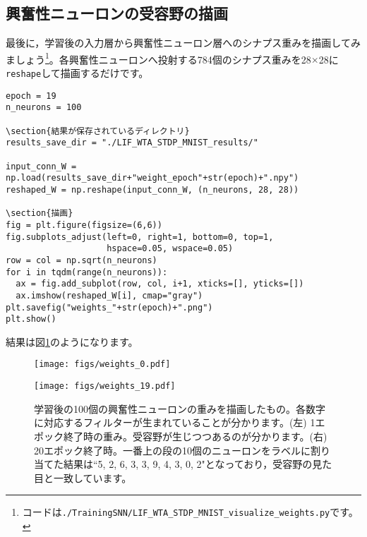 \subsection{興奮性ニューロンの受容野の描画}
最後に，学習後の入力層から興奮性ニューロン層へのシナプス重みを描画してみましょう\footnote{コードは\texttt{./TrainingSNN/LIF\_WTA\_STDP\_MNIST\_visualize\_weights.py}です。}。各興奮性ニューロンへ投射する784個のシナプス重みを28$\times$28に\texttt{reshape}して描画するだけです。
\begin{verbatim}
epoch = 19
n_neurons = 100

\section{結果が保存されているディレクトリ}
results_save_dir = "./LIF_WTA_STDP_MNIST_results/"

input_conn_W = np.load(results_save_dir+"weight_epoch"+str(epoch)+".npy")
reshaped_W = np.reshape(input_conn_W, (n_neurons, 28, 28))

\section{描画}
fig = plt.figure(figsize=(6,6))
fig.subplots_adjust(left=0, right=1, bottom=0, top=1,
                    hspace=0.05, wspace=0.05)
row = col = np.sqrt(n_neurons)
for i in tqdm(range(n_neurons)):
  ax = fig.add_subplot(row, col, i+1, xticks=[], yticks=[])
  ax.imshow(reshaped_W[i], cmap="gray")
plt.savefig("weights_"+str(epoch)+".png")
plt.show()
\end{verbatim}
結果は図\ref{fig:Diehl_weights}のようになります。
\begin{figure}[htbp]
 \begin{minipage}{0.5\hsize}
  \begin{center}
   \texttt{[image: figs/weights\_0.pdf]}
  \end{center}
 \end{minipage}
 \begin{minipage}{0.5\hsize}
  \begin{center}
   \texttt{[image: figs/weights\_19.pdf]}
  \end{center}
 \end{minipage}
\caption{学習後の100個の興奮性ニューロンの重みを描画したもの。各数字に対応するフィルターが生まれていることが分かります。(左) 1エポック終了時の重み。受容野が生じつつあるのが分かります。(右) 20エポック終了時。一番上の段の10個のニューロンをラベルに割り当てた結果は``5, 2, 6, 3, 3, 9, 4, 3, 0, 2"となっており，受容野の見た目と一致しています。}
\label{fig:Diehl_weights}
\end{figure}

